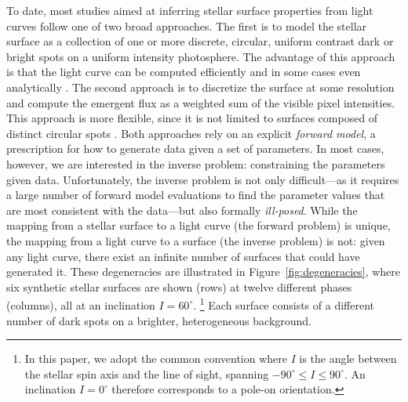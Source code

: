 \documentclass[modern]{aastex62}
\begin{document}
To date, most studies aimed at inferring stellar surface
properties from light curves follow one of two broad approaches. The
first is to model the stellar surface as a collection of one or more
discrete, circular, uniform contrast dark or bright spots on a uniform
intensity photosphere.
The advantage of this approach is that
the light curve can be computed efficiently and in some cases even
analytically \citep[e.g.,][]{Davenport2015,Morris2017,Morris2020b}.
%
The second approach is to discretize the surface at some resolution
and compute the emergent flux as a weighted sum of the visible pixel intensities.
This approach is more flexible, since it is not limited to surfaces
composed of distinct circular spots \citep[e.g.,][]{Harmon2000,Roettenbacher2017}.
%
Both approaches rely on an explicit \emph{forward model}, a prescription for
how to generate data given a set of parameters. In most cases, however, we are interested
in the inverse problem: constraining the parameters given data.
%
Unfortunately, the inverse problem is not only difficult---as it requires
a large number of forward model evaluations to find the parameter values
that are most consistent with the
data---but also formally \emph{ill-posed}.
%
While the mapping from a stellar surface to a light curve (the forward
problem) is unique, the mapping from a light curve to a surface
(the inverse problem) is not:
given any light curve, there exist an infinite number of surfaces that
could have generated it. These degeneracies are illustrated in
Figure~\ref{fig:degeneracies}, where six synthetic stellar surfaces
are shown (rows) at twelve different phases (columns), all at an
inclination $I=60^\circ$.%
\footnote{
    In this paper, we adopt the common convention where $I$ is the angle
    between the stellar spin axis and the line of sight,
    spanning $-90^\circ \leq I \leq 90^\circ$. An inclination $I=0^\circ$ therefore
    corresponds to a pole-on orientation.
}
Each surface
consists of a different number of dark spots on a brighter, heterogeneous
background.
\end{document}
